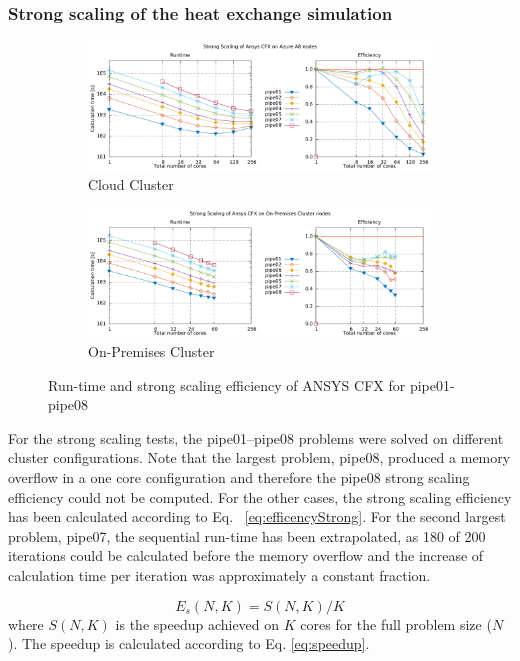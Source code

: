 \documentclass[3p,times]{elsarticle}
\begin{document}
\subsubsection{Strong scaling of the heat exchange simulation}
\begin{figure}

	\begin{subfigure}{\textwidth}
		\centering
		\includegraphics[width=.7\linewidth]{gplt-a8-strong-pipe}	
		\caption{Cloud Cluster}
		\label{fig:strongA8}
	\end{subfigure}

		\begin{subfigure}{\textwidth}
			\centering
			\includegraphics[width=.7\linewidth]{gplt-hsr-strong-pipe}
			\caption{On-Premises Cluster}
			\label{fig:strongHSR}
		\end{subfigure}
	\caption{Run-time and strong scaling efficiency of ANSYS CFX for pipe01-pipe08}
\end{figure}

For the strong scaling tests, the pipe01--pipe08 problems were solved on different cluster configurations. Note that the largest problem, pipe08, produced a memory overflow in a one core configuration and therefore the pipe08 strong scaling efficiency could not be computed. For the other cases, the strong scaling efficiency has been calculated according to Eq.~ \ref{eq:efficencyStrong}. For the second largest problem, pipe07, the sequential run-time has been extrapolated, as 180 of 200 iterations could be calculated before the memory overflow and the increase of calculation time per iteration was approximately a constant fraction.

\begin{equation}
\label{eq:efficencyStrong}
E_s(N,K) = S(N,K) / K 
\end{equation}
where $S(N,K)$ is the speedup achieved on $K$ cores for the full problem size ($N$). The speedup is calculated according to Eq. \ref{eq:speedup}.
\end{document}

